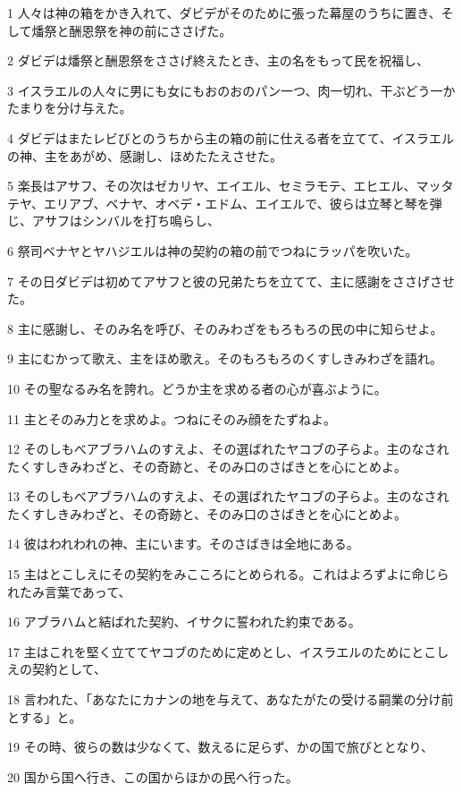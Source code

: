 \par 1 人々は神の箱をかき入れて、ダビデがそのために張った幕屋のうちに置き、そして燔祭と酬恩祭を神の前にささげた。
\par 2 ダビデは燔祭と酬恩祭をささげ終えたとき、主の名をもって民を祝福し、
\par 3 イスラエルの人々に男にも女にもおのおのパン一つ、肉一切れ、干ぶどう一かたまりを分け与えた。
\par 4 ダビデはまたレビびとのうちから主の箱の前に仕える者を立てて、イスラエルの神、主をあがめ、感謝し、ほめたたえさせた。
\par 5 楽長はアサフ、その次はゼカリヤ、エイエル、セミラモテ、エヒエル、マッタテヤ、エリアブ、ベナヤ、オベデ・エドム、エイエルで、彼らは立琴と琴を弾じ、アサフはシンバルを打ち鳴らし、
\par 6 祭司ベナヤとヤハジエルは神の契約の箱の前でつねにラッパを吹いた。
\par 7 その日ダビデは初めてアサフと彼の兄弟たちを立てて、主に感謝をささげさせた。
\par 8 主に感謝し、そのみ名を呼び、そのみわざをもろもろの民の中に知らせよ。
\par 9 主にむかって歌え、主をほめ歌え。そのもろもろのくすしきみわざを語れ。
\par 10 その聖なるみ名を誇れ。どうか主を求める者の心が喜ぶように。
\par 11 主とそのみ力とを求めよ。つねにそのみ顔をたずねよ。
\par 12 そのしもべアブラハムのすえよ、その選ばれたヤコブの子らよ。主のなされたくすしきみわざと、その奇跡と、そのみ口のさばきとを心にとめよ。
\par 13 そのしもべアブラハムのすえよ、その選ばれたヤコブの子らよ。主のなされたくすしきみわざと、その奇跡と、そのみ口のさばきとを心にとめよ。
\par 14 彼はわれわれの神、主にいます。そのさばきは全地にある。
\par 15 主はとこしえにその契約をみこころにとめられる。これはよろずよに命じられたみ言葉であって、
\par 16 アブラハムと結ばれた契約、イサクに誓われた約束である。
\par 17 主はこれを堅く立ててヤコブのために定めとし、イスラエルのためにとこしえの契約として、
\par 18 言われた、「あなたにカナンの地を与えて、あなたがたの受ける嗣業の分け前とする」と。
\par 19 その時、彼らの数は少なくて、数えるに足らず、かの国で旅びととなり、
\par 20 国から国へ行き、この国からほかの民へ行った。
